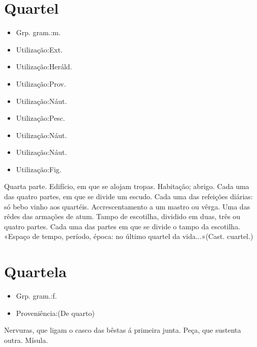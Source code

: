 \section{Quartel}
\begin{itemize}
\item {Grp. gram.:m.}
\end{itemize}
\begin{itemize}
\item {Utilização:Ext.}
\end{itemize}
\begin{itemize}
\item {Utilização:Heráld.}
\end{itemize}
\begin{itemize}
\item {Utilização:Prov.}
\end{itemize}
\begin{itemize}
\item {Utilização:Náut.}
\end{itemize}
\begin{itemize}
\item {Utilização:Pesc.}
\end{itemize}
\begin{itemize}
\item {Utilização:Náut.}
\end{itemize}
\begin{itemize}
\item {Utilização:Náut.}
\end{itemize}
\begin{itemize}
\item {Utilização:Fig.}
\end{itemize}
Quarta parte.
Edifício, em que se alojam tropas.
Habitação; abrigo.
Cada uma das quatro partes, em que se divide um escudo.
Cada uma das refeições diárias: \textunderscore só bebo vinho aos quartéis\textunderscore .
Accrescentamento a um mastro ou vêrga.
Uma das rêdes das armações de atum.
Tampo de escotilha, dividido em duas, três ou quatro partes.
Cada uma das partes em que se divide o tampo da escotilha.
«Espaço de tempo, período, época: \textunderscore no último quartel da vida...\textunderscore »(Cast. \textunderscore cuartel\textunderscore .)
\section{Quartela}
\begin{itemize}
\item {Grp. gram.:f.}
\end{itemize}
\begin{itemize}
\item {Proveniência:(De \textunderscore quarto\textunderscore )}
\end{itemize}
Nervuras, que ligam o casco das bêstas á primeira junta.
Peça, que sustenta outra.
Mísula.
